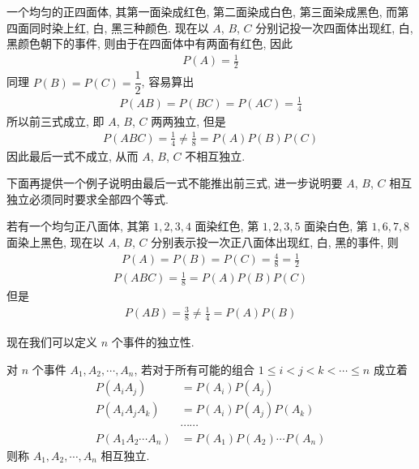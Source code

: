 \documentclass[../../main.tex]{subfiles}
\begin{document}
\begin{example}\label{example:ch02-四面体反例}
一个均匀的正四面体, 其第一面染成红色, 第二面染成白色, 第三面染成黑色, 而第四面同时染上红, 白, 黑三种颜色. 现在以 $A$, $B$, $C$ 分别记投一次四面体出现红, 白, 黑颜色朝下的事件, 则由于在四面体中有两面有红色, 因此
\begin{align*}
P(A)=\frac{1}{2}
\end{align*}
同理 $P(B)=P(C)=\dfrac{1}{2}$, 容易算出
\begin{align*}
P(AB)=P(BC)=P(AC)=\frac{1}{4}
\end{align*}
所以前三式成立, 即 $A$, $B$, $C$ 两两独立, 但是
\begin{align*}
P(ABC)=\frac{1}{4}\neq\frac{1}{8}=P(A)P(B)P(C)
\end{align*}
因此最后一式不成立, 从而 $A$, $B$, $C$ 不相互独立.
\end{example}

下面再提供一个例子说明由最后一式不能推出前三式, 进一步说明要 $A$, $B$, $C$ 相互独立必须同时要求全部四个等式.

\begin{example}[均匀正八面体]\label{example:ch02-正八面体反例}
若有一个均匀正八面体, 其第 $1,2,3,4$ 面染红色, 第 $1,2,3,5$ 面染白色, 第 $1,6,7,8$ 面染上黑色, 现在以 $A$, $B$, $C$ 分别表示投一次正八面体出现红, 白, 黑的事件, 则
\begin{align*}
P(A)=P(B)=P(C)=\frac{4}{8}=\frac{1}{2}
\end{align*}
\begin{align*}
P(ABC)=\frac{1}{8}=P(A)P(B)P(C)
\end{align*}
但是
\begin{align*}
P(AB)=\frac{3}{8}\neq\frac{1}{4}=P(A)P(B)
\end{align*}
\end{example}

现在我们可以定义 $n$ 个事件的独立性.

\begin{definition}[$n$ 个事件的独立性]\label{definition:ch02-n事件独立性}
对 $n$ 个事件 $A_1, A_2, \cdots, A_n$, 若对于所有可能的组合 $1\leqslant i<j<k<\cdots\leqslant n$ 成立着
\begin{subequations}\label{align:ch02-n事件独立}
\begin{align}
P(A_iA_j)&=P(A_i)P(A_j)\\
P(A_iA_jA_k)&=P(A_i)P(A_j)P(A_k)\\
&\cdots\cdots\nonumber\\
P(A_1A_2\cdots A_n)&=P(A_1)P(A_2)\cdots P(A_n)
\end{align}
\end{subequations}
则称 $A_1, A_2, \cdots, A_n$ 相互独立.
\end{definition}
\end{document}
